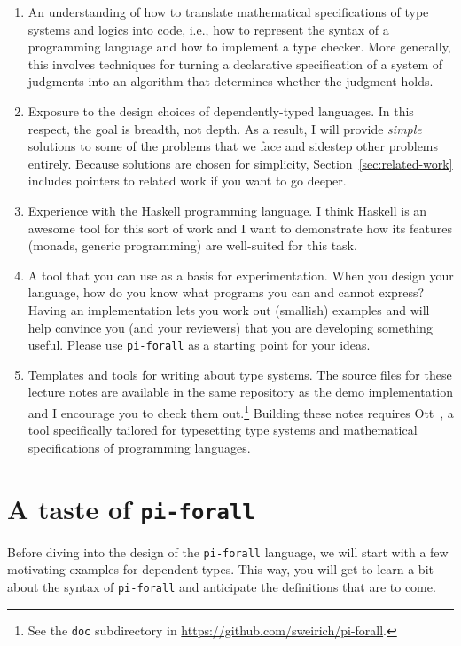 \documentclass{article}
\newcommand\pif{\texttt{pi-forall}\xspace}
\theoremstyle{definition}
\begin{document}
\begin{enumerate}
\item An understanding of how to translate mathematical specifications of type
  systems and logics into code, i.e., how to represent the syntax of a
  programming language and how to implement a type checker. More generally,
  this involves techniques for turning a declarative specification of a system
  of judgments into an algorithm that determines whether the judgment holds.

\item Exposure to the design choices of dependently-typed languages. In this
  respect, the goal is breadth, not depth. As a result, I will provide
  \emph{simple} solutions to some of the problems that we face and sidestep
  other problems entirely. Because solutions are chosen for simplicity,
  Section~\ref{sec:related-work} includes pointers to related work if you want to go
  deeper.

\item Experience with the Haskell programming language. I think Haskell is an
  awesome tool for this sort of work and I want to demonstrate how its
  features (monads, generic programming) are well-suited for this task.

\item A tool that you can use as a basis for experimentation. When you design
  your language, how do you know what programs you can and cannot express?
  Having an implementation lets you work out (smallish) examples and will help
  convince you (and your reviewers) that you are developing something useful.
  Please use \pif as a starting point for your ideas.

\item Templates and tools for writing about type systems. The source files for
  these lecture notes are available in the same repository as the demo
  implementation and I encourage you to check them out.\footnote{See the
    \texttt{doc} subdirectory in \url{https://github.com/sweirich/pi-forall}.}
  Building these notes requires Ott~\cite{ott}, a tool specifically tailored
  for typesetting type systems and mathematical specifications of programming
  languages.
\end{enumerate}

\section{A taste of \pif}
\label{sec:examples}

Before diving into the design of the \pif language, we will start with a few
motivating examples for dependent types. This way, you will get to learn a bit
about the syntax of \pif and anticipate the definitions that are to come.
\end{document}
